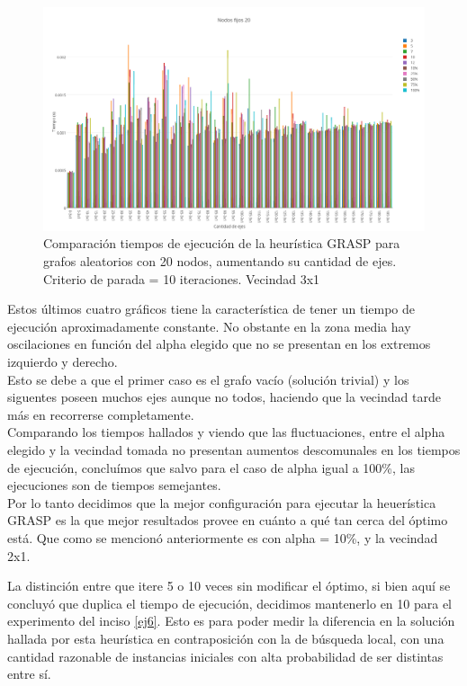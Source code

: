   \begin{figure}[h!]
   \begin{center}
 	\includegraphics[scale=0.35]{imagenes/grasp/20nodos-10repes-v2.png}
 	\caption{Comparaci\'on tiempos de ejecuci\'on de la heur\'istica GRASP para grafos aleatorios con 20 nodos, aumentando su cantidad de ejes. Criterio de parada = 10 iteraciones. Vecindad 3x1}
   \end{center}
 \end{figure}
\newpage

Estos \'ultimos cuatro gr\'aficos tiene la caracter\'istica de tener un tiempo de ejecuci\'on aproximadamente constante. No obstante en la zona media hay oscilaciones en funci\'on del alpha elegido que no se presentan en los extremos izquierdo y derecho.\\

Esto se debe a que el primer caso es el grafo vac\'io (soluci\'on trivial) y los siguentes poseen muchos ejes aunque no todos, haciendo que la vecindad tarde m\'as en recorrerse completamente.\\

Comparando los tiempos hallados y viendo que las fluctuaciones, entre el alpha elegido y la vecindad tomada no presentan aumentos descomunales en los tiempos de ejecuci\'on, conclu\'imos que salvo para el caso de alpha igual a 100\%, las ejecuciones son de tiempos semejantes.\\

Por lo tanto decidimos que la mejor configuraci\'on para ejecutar la heuer\'istica GRASP es la que mejor resultados provee en cu\'anto a qu\'e tan cerca del \'optimo est\'a. Que como se mencion\'o anteriormente es con alpha = 10\%, y la vecindad 2x1.

La distinci\'on entre que itere 5 o 10 veces sin modificar el \'optimo, si bien aqu\'i se concluy\'o que duplica el tiempo de ejecuci\'on, decidimos mantenerlo   en 10 para el experimento del inciso \ref{ej6}. Esto es para poder medir la  diferencia en la soluci\'on hallada por esta heur\'istica en contraposici\'on con la de b\'usqueda local, con una cantidad razonable de instancias iniciales con alta probabilidad de ser distintas entre s\'i.

